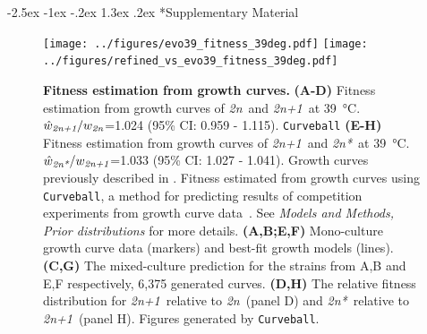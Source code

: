 \documentclass[12pt]{extarticle}
\makeatletter
\renewcommand\section{\@startsection {section}{1}{\z@}%
     {-2.5ex \@plus -1ex \@minus -.2ex}%
     {1.3ex \@plus.2ex}%
    {\Large\bfseries}}
\newcommand{\euwt}{\emph{2n}}
\newcommand{\anwt}{\emph{2n+1}}
\newcommand{\eumt}{\emph{2n*}}
\newcommand{\beginsupplement}{%
      	\setcounter{table}{0}
        \renewcommand{\thetable}{S\arabic{table}}%
        \setcounter{figure}{0}
        \renewcommand{\thefigure}{S\arabic{figure}}%
}
\makeatother
\begin{document}
\newpage

\section*{Supplementary Material}
\beginsupplement %

\begin{figure}[h]
	\centering
	\texttt{[image: ../figures/evo39\_fitness\_39deg.pdf]} 
	\texttt{[image: ../figures/refined\_vs\_evo39\_fitness\_39deg.pdf]}
\caption{
    \textbf{Fitness estimation from growth curves.}
    \textbf{(A-D)} Fitness estimation from growth curves of \euwt\ and \anwt\ at \SI{39}{\celsius}. $\hat w_{\anwt}/w_{\euwt}$=1.024 (95\% CI: 0.959 - 1.115). \texttt{Curveball} 
    \textbf{(E-H)} Fitness estimation from growth curves of \anwt\ and \eumt\ at \SI{39}{\celsius}. $\hat w_{\eumt}/w_{\anwt}$=1.033 (95\% CI: 1.027 - 1.041).
    Growth curves previously described in \citet[Figs. 3C, 4A, and S2]{Yona2012}.
	Fitness estimated from growth curves using \texttt{Curveball}, a method for predicting results of competition experiments from growth curve data~\citep[\href{https://curveball.yoavram.com}{curveball.yoavram.com}]{Ram2019}. See \emph{Models and Methods, Prior distributions} for more details.  \textbf{(A,B;E,F)} Mono-culture growth curve data (markers) and best-fit growth models (lines).
\textbf{(C,G)} The mixed-culture prediction for the strains from A,B and E,F respectively, 6,375 generated curves. \textbf{(D,H)} The relative fitness distribution for \anwt\ relative to \euwt\ (panel D) and \eumt\ relative to \anwt\ (panel H). Figures generated by \texttt{Curveball}.
} 
\label{fig:growth-curves}
\end{figure}
\end{document}
